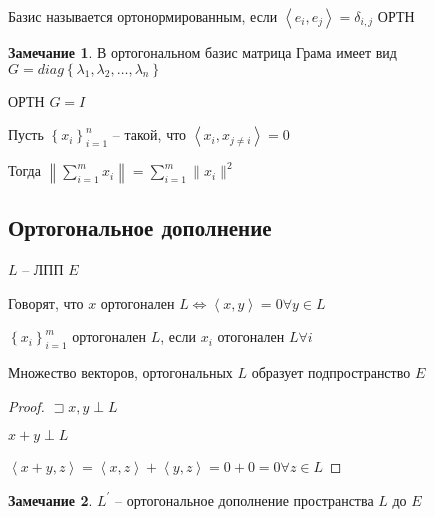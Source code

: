 \documentclass{book}
\newcommand{\p}[1]{#1^{\prime}}
\theoremstyle{definition}
\newtheorem*{note}{Замечание}
\begin{document}
\begin{definition}
    Базис называется ортонормированным, если $\left<e_i, e_j \right> = \delta_{i,j}$ ОРТН
\end{definition}

\begin{note}
    В ортогональном базис матрица Грама имеет вид $G = diag\left\{ \lambda_1 ,\lambda_2, \ldots, \lambda_n \right\} $ 

    ОРТН $G = I$
\end{note}

\begin{theorem}[Пифагора]
    Пусть $\left\{ x_i \right\} _{i=1}^n$ -- такой, что $\left<x_i, x_{j\neq i} \right> = 0$ 

    Тогда $\left\| \sum_{i=1}^{m} x_i \right\| = \sum_{i=1}^{m} \|x_i\|^2$ 
\end{theorem}

\subsection{Ортогональное дополнение}

$L$ -- ЛПП  $E$

 \begin{definition}
    Говорят, что $x$ ортогонален  $L \iff \left<x, y \right> = 0 \forall y\in L$
\end{definition}

\begin{definition}
    $\left\{ x_i \right\} _{i=1}^m$ ортогонален $L$, если  $x_i$ отогонален  $L \forall i$
\end{definition}

\begin{lemma}
   Множество векторов, ортогональных $L$ образует подпространство  $E$
\end{lemma}
\begin{proof}
    $\sqsupset x, y \perp L$

    $x + y\perp L$

     $\left<x+y, z \right> = \left<x, z \right> + \left<y, z \right> = 0 + 0 = 0 \forall  z\in L$
\end{proof}

\begin{note}
    $\p L$ -- ортогональное дополнение пространства  $L$ до   $E$
\end{note}
\end{document}
